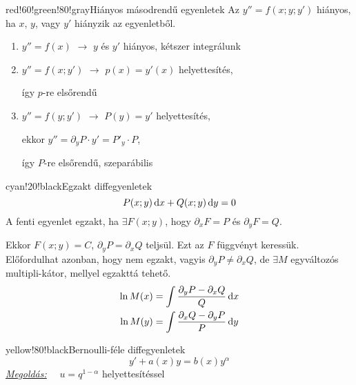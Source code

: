 \documentclass[main.tex]{subfiles}
\begin{document}
\begin{cbox}{red!60!green!80!gray}{Hiányos másodrendű egyenletek}
  Az $y'' = f(x; y; y')$ hiányos, ha $x$, $y$, vagy $y'$
  hiányzik az egyenletből.
  \begin{enumerate}
    \item $y'' = f(x)$
          \tabto{2.65cm} $\rightarrow$ \tabto{3.65cm}
          $y$ és $y'$ hiányos, kétszer integrálunk

    \item $y'' = f(x; y')$
          \tabto{2.65cm} $\rightarrow$ \tabto{3.65cm}
          $p(x) = y'(x)$ helyettesítés,

          \tabto{3.65cm}
          így $p$-re elsőrendű

    \item $y'' = f(y; y')$
          \tabto{2.65cm} $\rightarrow$ \tabto{3.65cm}
          $P(y) = y'$ helyettesítés,

          \tabto{3.65cm}
          ekkor $y'' = \partial_y P \cdot y' = P'_y \cdot P$,

          \tabto{3.65cm}
          így $P$-re elsőrendű, szeparábilis
  \end{enumerate}
\end{cbox}



\begin{cbox}{cyan!20!black}{Egzakt diffegyenletek}
  \[
    P(x;y) \, \mathrm{d} x + Q(x;y) \, \mathrm{d} y = 0
  \]
  A fenti egyenlet egzakt, ha $\exists F(x;y)$, hogy
  $\partial_x F = P$ és $\partial_y F = Q$.

  Ekkor $F(x; y) = C$, $\partial_y P = \partial_x Q$
  teljsül. Ezt az $F$ függvényt keressük.
  \\[2mm]
  Előfordulhat azonban, hogy nem egzakt, vagyis
  $\partial_y P \neq \partial_x Q$, de $\exists M$
  egyváltozós multipli-kátor, mellyel egzakttá tehető.
  \begin{align*}
    \ln M(x)
     & = \int \frac{\partial_y P - \partial_x Q}{Q} \, \mathrm{d} x
    \\
    \ln M(y)
     & = \int \frac{\partial_x Q - \partial_y P}{P} \, \mathrm{d} y
  \end{align*}
\end{cbox}



\begin{cbox}{yellow!80!black}{Bernoulli-féle diffegyenletek}
  \[
    y' + a(x)y = b(x)y^\alpha
  \]
  \emph{\underline{Megoldás:}}
  $\quad u = q^{1-\alpha}$ helyettesítéssel
\end{cbox}
\end{document}
